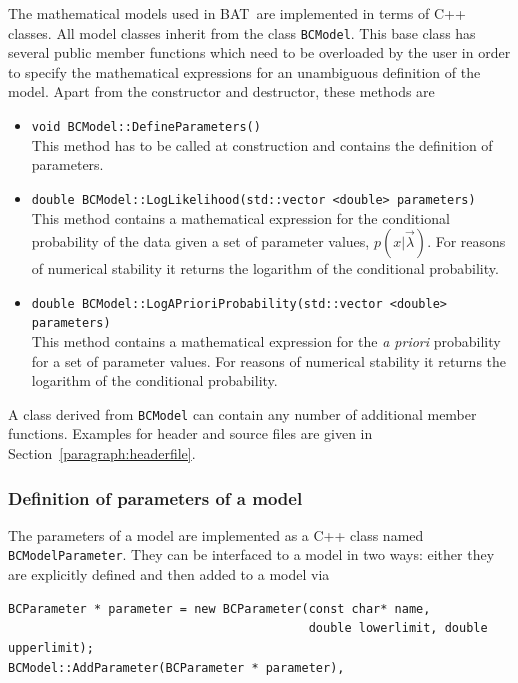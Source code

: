 \documentclass[11pt, a4paper]{article}
\newcommand{\BAT}{{\sc BAT}}
\begin{document}
The mathematical models used in \BAT\ are implemented in terms of C++
classes. All model classes inherit from the class \verb|BCModel|. This
base class has several public member functions which need to be
overloaded by the user in order to specify the mathematical
expressions for an unambiguous definition of the model. Apart from the
constructor and destructor, these methods are
% 
\begin{itemize}
\item \verb|void BCModel::DefineParameters()| \\
This method has to be called at construction and contains the
definition of parameters.
% 
\item \verb|double BCModel::LogLikelihood(std::vector <double> parameters)| \\ 
This method contains a mathematical expression for the conditional
probability of the data given a set of parameter values,
$p(x|\vec{\lambda})$. For reasons of numerical stability it returns
the logarithm of the conditional probability.
%
\item \verb|double BCModel::LogAPrioriProbability(std::vector <double> parameters)| \\
This method contains a mathematical expression for the {\it a priori}
probability for a set of parameter values. For reasons of numerical
stability it returns the logarithm of the conditional probability.
\end{itemize} 

\noindent 
A class derived from \verb|BCModel| can contain any number of
additional member functions. Examples for header and source files are
given in Section~\ref{paragraph:headerfile}.


\subsubsection{Definition of parameters of a model} 
\label{subsubsection:parameters}

The parameters of a model are implemented as a C++ class named
\verb|BCModelParameter|. They can be interfaced to a model in two
ways: either they are explicitly defined and then added to a model via
%
\begin{verbatim}
BCParameter * parameter = new BCParameter(const char* name, 
                                          double lowerlimit, double upperlimit); 
BCModel::AddParameter(BCParameter * parameter),
\end{verbatim}
\end{document}
